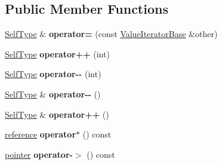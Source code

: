 \subsection*{Public Member Functions}
\begin{DoxyCompactItemize}
\item 
\hypertarget{class_json_1_1_value_const_iterator_ad1b1c11f8d7fb22d4d3c231915f2b15b}{}\hyperlink{class_json_1_1_value_iterator_base}{Self\+Type} \& {\bfseries operator=} (const \hyperlink{class_json_1_1_value_iterator_base}{Value\+Iterator\+Base} \&other)\label{class_json_1_1_value_const_iterator_ad1b1c11f8d7fb22d4d3c231915f2b15b}

\item 
\hypertarget{class_json_1_1_value_const_iterator_ab3f0c2edbfc8f7d60645f3d597d05e28}{}\hyperlink{class_json_1_1_value_iterator_base}{Self\+Type} {\bfseries operator++} (int)\label{class_json_1_1_value_const_iterator_ab3f0c2edbfc8f7d60645f3d597d05e28}

\item 
\hypertarget{class_json_1_1_value_const_iterator_a94935961e9331c6f7b907b05ec8df75e}{}\hyperlink{class_json_1_1_value_iterator_base}{Self\+Type} {\bfseries operator-\/-\/} (int)\label{class_json_1_1_value_const_iterator_a94935961e9331c6f7b907b05ec8df75e}

\item 
\hypertarget{class_json_1_1_value_const_iterator_a31415e44e44e56fb2bfda7e8bb784646}{}\hyperlink{class_json_1_1_value_iterator_base}{Self\+Type} \& {\bfseries operator-\/-\/} ()\label{class_json_1_1_value_const_iterator_a31415e44e44e56fb2bfda7e8bb784646}

\item 
\hypertarget{class_json_1_1_value_const_iterator_a2cfe2f7a94a688186efdafb1b181c319}{}\hyperlink{class_json_1_1_value_iterator_base}{Self\+Type} \& {\bfseries operator++} ()\label{class_json_1_1_value_const_iterator_a2cfe2f7a94a688186efdafb1b181c319}

\item 
\hypertarget{class_json_1_1_value_const_iterator_aeb44153d71c61ac9397a84d5ecc244c5}{}\hyperlink{class_json_1_1_value}{reference} {\bfseries operator$\ast$} () const \label{class_json_1_1_value_const_iterator_aeb44153d71c61ac9397a84d5ecc244c5}

\item 
\hypertarget{class_json_1_1_value_const_iterator_ac493d31c8eede8af10b71415fe8e624b}{}\hyperlink{class_json_1_1_value}{pointer} {\bfseries operator-\/$>$} () const \label{class_json_1_1_value_const_iterator_ac493d31c8eede8af10b71415fe8e624b}

\end{DoxyCompactItemize}
